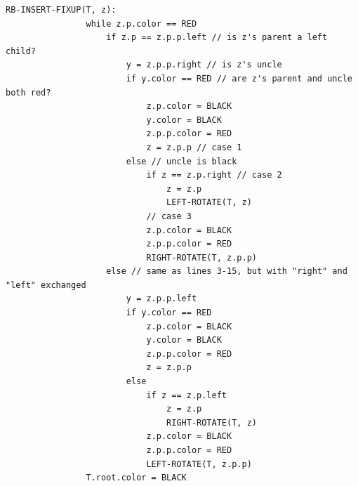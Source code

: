 \documentclass[a4paper,12pt]{article}
\begin{document}
	\begin{LTR}
		\begin{lstlisting}[caption={RB-INSERT-FIXUP}, label={lst:rb-insert-fixup}]
			RB-INSERT-FIXUP(T, z):
				while z.p.color == RED
					if z.p == z.p.p.left // is z's parent a left child?
						y = z.p.p.right // is z's uncle
						if y.color == RED // are z's parent and uncle both red?
							z.p.color = BLACK
							y.color = BLACK
							z.p.p.color = RED
							z = z.p.p // case 1
						else // uncle is black
							if z == z.p.right // case 2
								z = z.p
								LEFT-ROTATE(T, z)
							// case 3
							z.p.color = BLACK
							z.p.p.color = RED
							RIGHT-ROTATE(T, z.p.p)
					else // same as lines 3-15, but with "right" and "left" exchanged
						y = z.p.p.left
						if y.color == RED
							z.p.color = BLACK
							y.color = BLACK
							z.p.p.color = RED
							z = z.p.p
						else
							if z == z.p.left
								z = z.p
								RIGHT-ROTATE(T, z)
							z.p.color = BLACK
							z.p.p.color = RED
							LEFT-ROTATE(T, z.p.p)
				T.root.color = BLACK
		\end{lstlisting}
	\end{LTR}
\end{document}
